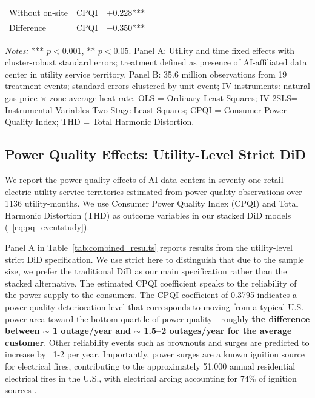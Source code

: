 \documentclass[sigconf,authordraft]{acmart}
\newcommand{\nb}[1]{\textcolor{blue}{NB[#1]}}
\begin{document}
\begin{table}[t]
\begin{tabular}{llcp{10cm}}
Without on-site & CPQI & +0.228*** & \\
Difference & CPQI & $-0.350$*** & \\
\bottomrule
\end{tabular}
\begin{flushleft}
\footnotesize\textit{Notes:} *** $p < 0.001$, ** $p < 0.05$. Panel A: Utility and time fixed effects with cluster-robust standard errors; treatment defined as presence of AI-affiliated data center in utility service territory. Panel B: 35.6 million observations from 19 treatment events; standard errors clustered by unit-event; IV instruments: natural gas price $\times$ zone-average heat rate. OLS = Ordinary Least Squares; IV 2SLS= Instrumental Variables Two Stage Least Squares; CPQI = Consumer Power Quality Index; THD = Total Harmonic Distortion. 
\end{flushleft}
\end{table}

\subsection{Power Quality Effects: Utility-Level Strict DiD}\label{subsec:power-quality-results}

We report the power quality effects of AI data centers in seventy one retail electric utility service territories estimated from power quality observations over 1136 utility-months. We use Consumer Power Quality Index (CPQI) and Total Harmonic Distortion (THD) as outcome variables in our stacked DiD models (~\autoref{eq:pq_eventstudy}). 

Panel A in Table~\ref{tab:combined_results} reports results from the utility-level strict DiD specification. We use strict here to distinguish that due to the sample size, we prefer the traditional DiD as our main specification rather than the stacked alternative.
The estimated CPQI coefficient speaks to the reliability of the power supply to the consumers. The CPQI coefficient of 0.3795 indicates a power quality deterioration level that corresponds to moving from a typical U.S. power area toward the bottom quartile of power quality—roughly \textbf{the difference between $\sim$ 1 outage/year and $\sim$ 1.5–2 outages/year for the average customer}. Other reliability events such as brownouts and surges are predicted to increase by ~1-2 per year. Importantly, power surges are a known ignition source for electrical fires, contributing to the approximately 51,000 annual residential electrical fires in the U.S., with electrical arcing accounting for 74\% of ignition sources \cite{usfa2019electrical}. 
\end{document}
